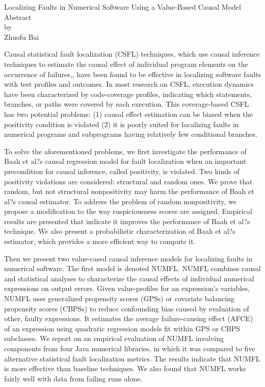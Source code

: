 \newpage
\begin{centering}
  Localizing Faults in Numerical Software Using a Value-Based Causal Model
  \\
  \vspace{1cm}
  Abstract\\
  by\\
  \vspace{1cm}
  Zhuofu Bai\\
  \vspace{1cm}
\end{centering}



Causal statistical fault localization (CSFL) techniques,  which use causal inference techniques to  estimate the causal effect of individual program elements on the occurrence of failures,, have been found to be effective in localizing software faults with test profiles and outcomes. In most research on CSFL, execution dynamics have been characterized by code-coverage profiles, indicating which statements, branches, or paths were covered by each execution. This coverage-based CSFL has two potential problems: (1) causal effect estimation can be biased when the positivity condition is violated  (2) it is poorly suited for localizing faults in numerical programs and subprograms having relatively few conditional branches. 

To solve the aforementioned problems, we first investigate the performance of Baah et al?s causal regression model for fault localization when an important precondition for causal inference, called positivity, is violated.  Two kinds of positivity violations are considered: structural and random ones.  We prove that random, but not structural nonpositivity may harm the performance of Baah et al?s causal estimator.  To address the problem of random nonpositivity, we propose a modification to the way suspiciousness scores are assigned.  Empirical results are presented that indicate it improves the performance of Baah et al?s technique. We also present a probabilistic characterization of Baah et al?s estimator, which provides a more efficient way to compute it.

Then we present two value-cased causal inference models for localizing faults in numerical software. The first model is denoted NUMFL. NUMFL combines causal and statistical analyses to characterize the causal effects of individual numerical expressions on output errors.  Given value-profiles for an expression's variables, NUMFL uses generalized propensity scores (GPSs) or covariate balancing propensity scores (CBPSs) to reduce confounding bias caused by evaluation of other, faulty expressions.  It estimates the average failure-causing effect (AFCE) of an expression using quadratic regression models fit within GPS or CBPS subclasses.  We report on an empirical evaluation of NUMFL involving components from four Java numerical libraries, in which it was compared to five alternative statistical fault localization metrics.  The results indicate that NUMFL is more effective than baseline techniques. We also found that NUMFL works fairly well with data from failing runs alone. 


